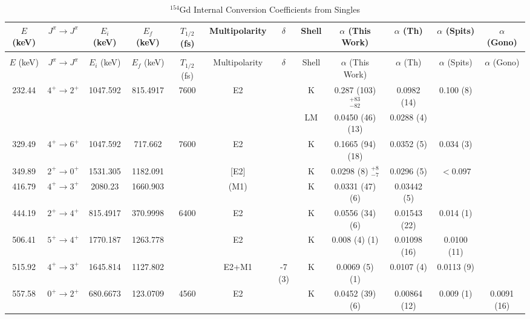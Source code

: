\begin{sidewaystable}
\scriptsize
    \begin{longtable}{c|c|c|c|c|c|c|c|c|c|c|c}
        \caption{$^{154}$Gd Internal Conversion Coefficients from Singles}
        \label{tab:154Gd_Single_ICC}\\
        \toprule
        $E$ (keV)	&	$J^{\pi}	\rightarrow	J^{\pi}$	&	$E_i$ (keV)	&	$E_f$ (keV)	&	$T_{1/2}$ (fs)	&	Multipolarity	&	$\delta$	& Shell &	$\alpha$ (This Work)				&	$\alpha$  (Th)	&	$\alpha$ (Spits) & $\alpha$ (Gono)		\\
        \hline
        \endfirsthead
        \caption[]{$^{154}$Gd Internal Conversion Coefficients from Singles}\\
        \toprule
        $E$ (keV)	&	$J^{\pi}	\rightarrow	J^{\pi}$	&	$E_i$ (keV)	&	$E_f$ (keV)	&	$T_{1/2}$ (fs)	&	Multipolarity	&	$\delta$	& Shell &	$\alpha$ (This Work)				&	$\alpha$  (Th)	&	$\alpha$ (Spits) & $\alpha$ (Gono)	\\
        \hline
	    \endhead
	    \hline
        232.44	&	$4^+	\rightarrow	2^+$	&	1047.592	&	815.4917	&	7600	&	E2	&	& K	&	0.287	(103) $^{+83}_{-82}$	&	0.0982 (14)	&	0.100 (8)	\\
	    &				&		&		&		&		&	& LM &	0.0450	(46) (13)	&	0.0288 (4)	&		\\
	    \hline
        329.49	&	$4^+	\rightarrow	6^+$	&	1047.592	&	717.662	&	7600	&	E2	&		& K &	0.1665	(94) (18)	&	0.0352 (5)	&	0.034 (3)	\\
        \hline
        349.89	&	$2^+	\rightarrow	0^+$	&	1531.305	&	1182.091	&		&	[E2]	&		& K &	0.0298 (8) $^{+8}_{-7}$	&	0.0296 (5)	& $<0.097$ &		\\
        \hline
        416.79	&	$4^+	\rightarrow	3^+$	&	2080.23	&	1660.903	&		&	(M1)	&		& K &	0.0331	(47) (6)	&	0.03442 (5)	&	\\
        \hline
        444.19	&	$2^+	\rightarrow	4^+$	&	815.4917	&	370.9998	&	6400	&	E2	&		& K &	0.0556	(34) (6)	&	0.01543 (22)	&	0.014 (1)	\\
        \hline
        506.41	&	$5^+	\rightarrow	4^+$	&	1770.187	&	1263.778	&		&	E2	&		& K &	0.008	(4) (1)	&	0.01098 (16)	&	0.0100 (11)	\\
        \hline
        515.92	&	$4^+	\rightarrow	3^+$	&	1645.814	&	1127.802	&		&	E2+M1	&	-7 (3)	& K &	0.0069	(5) (1)	&	0.0107 (4)	&	0.0113 (9)	\\
        \hline
        557.58	&	$0^+	\rightarrow	2^+$	&	680.6673	&	123.0709	&	4560	&	E2	&		& K &	0.0452	(39) (6)	&	0.00864 (12)	&	0.009 (1) & 0.0091 (16)	\\

\end{longtable}
\end{sidewaystable}
